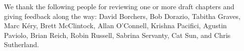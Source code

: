 We thank the following people for reviewing one or more draft chapters
and giving feedback along the way:
David Borchers,
Bob Dorazio,
Tabitha Graves,
Marc K\'{e}ry,   %
Brett McClintock,
Allan O'Connell,
Krishna Pacifici,
Agustin Paviolo,
Brian Reich,
Robin Russell,
Sabrina Servanty,
Cat Sun,
and
Chris Sutherland.


